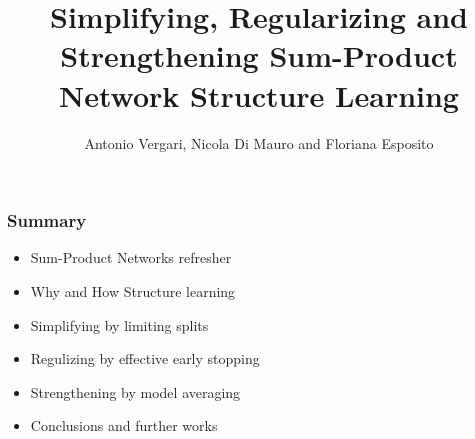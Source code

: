 \documentclass[xcolor={usenames,dvipsnames,svgnames}, compress]{beamer}
\begin{document}
\title{Simplifying, Regularizing and Strengthening Sum-Product Network Structure Learning}
\author{Antonio  Vergari, Nicola  {Di Mauro} and Floriana Esposito}


{
  \begin{frame}
    \titlepage
  \end{frame}
}

\begin{frame}
  \frametitle{Summary}
  \begin{itemize}
  \item Sum-Product Networks refresher
  \item Why and How Structure learning
  \item Simplifying by limiting splits
  \item Regulizing by effective early stopping
  \item Strengthening by model averaging
    \item Conclusions and further works
  \end{itemize}
\end{frame}
\end{document}
